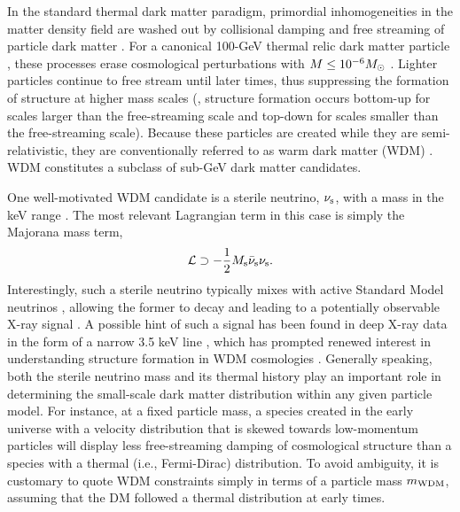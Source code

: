 In the standard thermal dark matter paradigm, primordial inhomogeneities in the matter density field are washed out by collisional damping and free streaming of particle dark matter \citep{Hofmann:2001,Green:2003un, Bertschinger:2006nq, Loeb:2005pm}.  
For a canonical 100-GeV thermal relic dark matter particle \citep[\eg, the WIMP;][]{Jungman:1995df}, these processes erase cosmological perturbations with $M \leq 10^{-6} M_\odot$ \citep[i.e., Earth mass;][]{Green:2003un, 2005Natur.433..389D}. 
Lighter particles continue to free stream until later times, thus suppressing the formation of structure at higher mass scales (\eg, structure formation occurs bottom-up for scales larger than the free-streaming scale and top-down for scales smaller than the free-streaming scale). Because these particles are created while they are semi-relativistic, they are conventionally referred to as warm dark matter (WDM) \citep{Bond:1983hb,Bode:2000gq,Dalcanton:2000hn}. 
WDM constitutes a subclass of sub-GeV dark matter candidates.

One well-motivated WDM candidate is a sterile neutrino, $\nu_{\rm s}$, with a mass in the keV range \citep[\eg][]{Abazajian:2017tcc,Adhikari:2017}. The most relevant Lagrangian term in this case is simply the Majorana mass term,
\begin{equation}
    \mathcal{L} \supset -\frac{1}{2}M_{\rm s}\bar{\nu}_{\rm s} \nu_{\rm s}.
\end{equation}
Interestingly, such a sterile neutrino typically mixes with active Standard Model neutrinos \citep[\eg,][]{Asaka:2005an}, allowing the former to decay and leading to a potentially observable X-ray signal \citep[\eg,][]{Abazajian:2001vt}. A possible hint of such a signal has been found in deep X-ray data in the form of a narrow 3.5 keV line \citep{Boyarsky:2014, Bulbul:2014, Boyarsky:2015, Iakubovskyi:2015}, which has prompted renewed interest in understanding structure formation in WDM cosmologies \citep[\eg,][]{Lovell:2013ola,Bose:2016irl,Bozek:2018ekc}. Generally speaking, both the sterile neutrino mass and its thermal history play an important role in determining the small-scale dark matter distribution within any given particle model. For instance, at a fixed particle mass, a species created in the early universe with a velocity distribution that is skewed towards low-momentum particles \citep[\eg,][]{Shi:1998km,Venumadhav:2015pla} will display less free-streaming damping of cosmological structure than a species with a thermal (i.e., Fermi-Dirac) distribution. To avoid ambiguity, it is customary to quote WDM constraints simply in terms of a particle mass $m_{\rm WDM}$, assuming that the DM followed a thermal distribution at early times.

